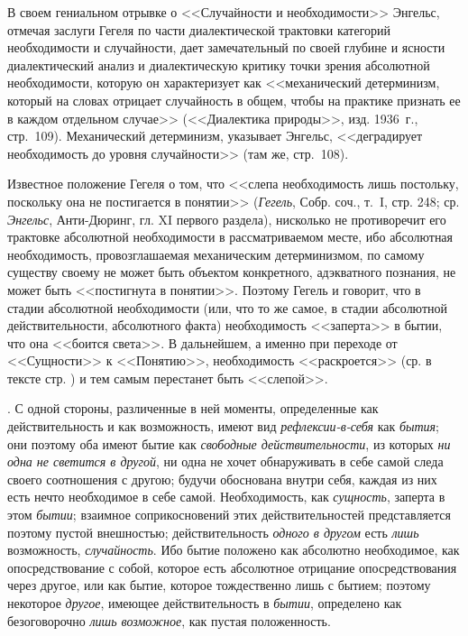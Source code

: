 {В своем гениальном отрывке о <<Случайности и необходимости>> Энгельс, отмечая
заслуги Гегеля по части диалектической трактовки категорий необходимости и
случайности, дает замечательный по своей глубине и ясности диалектический
анализ и диалектическую критику точки зрения абсолютной необходимости,
которую он характеризует как <<механический детерминизм, который на словах
отрицает случайность в общем, чтобы на практике признать ее в каждом
отдельном случае>> (<<Диалектика природы>>, изд. 1936~г., стр.~109).
Механический детерминизм, указывает Энгельс, <<деградирует необходимость до
уровня случайности>> (там же, стр.~108).

Известное положение Гегеля о том, что <<слепа необходимость лишь постольку,
поскольку она не постигается в понятии>> ({\em Гегель}, Собр. соч., т.~I,
стр. 248; ср. {\em Энгельс}, Анти-Дюринг, гл. XI первого раздела),
нисколько не противоречит его трактовке абсолютной необходимости в
рассматриваемом месте, ибо абсолютная необходимость, провозглашаемая
механическим детерминизмом, по самому существу своему не может быть
объектом конкретного, адэкватного познания, не может быть <<постигнута в
понятии>>. Поэтому Гегель и говорит, что в стадии абсолютной необходимости
(или, что то же самое, в стадии абсолютной действительности, абсолютного
факта) необходимость <<заперта>> в бытии, что она <<боится света>>. В
дальнейшем, а именно при переходе от <<Сущности>> к <<Понятию>>, необходимость
<<раскроется>> (ср. в тексте стр. \pageref{bkm:bm93a}) и тем самым перестанет
быть <<слепой>>.}.
С одной стороны, различенные в ней моменты, определенные как
действительность и как возможность, имеют вид
{\em рефлексии-в-себя} как {\em бытия}; они поэтому оба имеют бытие как
{\em свободные действительности}, из которых
{\em ни одна не светится в другой}, ни одна не хочет
обнаруживать в себе самой следа своего соотношения с другою; будучи
обоснована внутри себя, каждая из них есть нечто необходимое в себе самой.
Необходимость, как {\em сущность}, заперта в этом
{\em бытии}; взаимное соприкосновений этих
действительностей представляется поэтому пустой внешностью;
действительность {\em одного в другом} есть
{\em лишь} возможность,
{\em случайность}. Ибо бытие положено как абсолютно
необходимое, как опосредствование с собой, которое есть абсолютное
отрицание опосредствования через другое, или как бытие, которое
тождественно лишь с бытием; поэтому некоторое
{\em другое}, имеющее действительность в
{\em бытии}, определено как безоговорочно
{\em лишь возможное}, как пустая положенность.

